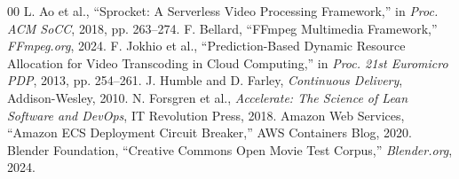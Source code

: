 \documentclass[conference]{IEEEtran}
\begin{document}
\begin{thebibliography}{00}
 L. Ao et al., ``Sprocket: A Serverless Video Processing Framework,'' in \textit{Proc. ACM SoCC}, 2018, pp. 263–274.
 F. Bellard, ``FFmpeg Multimedia Framework,'' \textit{FFmpeg.org}, 2024.
 F. Jokhio et al., ``Prediction-Based Dynamic Resource Allocation for Video Transcoding in Cloud Computing,'' in \textit{Proc. 21st Euromicro PDP}, 2013, pp. 254–261.
 J. Humble and D. Farley, \textit{Continuous Delivery}, Addison-Wesley, 2010.
 N. Forsgren et al., \textit{Accelerate: The Science of Lean Software and DevOps}, IT Revolution Press, 2018.
 Amazon Web Services, ``Amazon ECS Deployment Circuit Breaker,'' AWS Containers Blog, 2020.
 Blender Foundation, ``Creative Commons Open Movie Test Corpus,'' \textit{Blender.org}, 2024.
\end{thebibliography}
\end{document}
